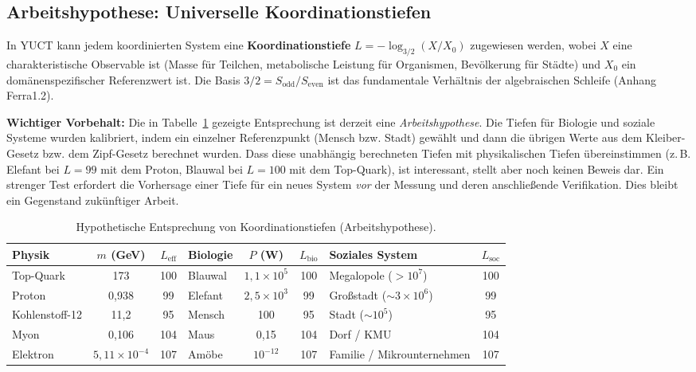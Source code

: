 \documentclass[11pt]{article}
\theoremstyle{remark}
\begin{document}
	\subsection{Arbeitshypothese: Universelle Koordinationstiefen}
	\label{sec:isomorphism}
	
	In YUCT kann jedem koordinierten System eine \textbf{Koordinationstiefe} \(L = -\log_{3/2}(X/X_0)\) zugewiesen werden, wobei \(X\) eine charakteristische Observable ist (Masse für Teilchen, metabolische Leistung für Organismen, Bevölkerung für Städte) und \(X_0\) ein domänenspezifischer Referenzwert ist. Die Basis \(3/2 = S_{\mathrm{odd}}/S_{\mathrm{even}}\) ist das fundamentale Verhältnis der algebraischen Schleife (Anhang Ferra1.2).
	
	\textbf{Wichtiger Vorbehalt:} Die in Tabelle~\ref{tab:universal_depths} gezeigte Entsprechung ist derzeit eine \emph{Arbeitshypothese}. Die Tiefen für Biologie und soziale Systeme wurden kalibriert, indem ein einzelner Referenzpunkt (Mensch bzw. Stadt) gewählt und dann die übrigen Werte aus dem Kleiber-Gesetz bzw. dem Zipf-Gesetz berechnet wurden. Dass diese unabhängig berechneten Tiefen mit physikalischen Tiefen übereinstimmen (z. B. Elefant bei \(L=99\) mit dem Proton, Blauwal bei \(L=100\) mit dem Top-Quark), ist interessant, stellt aber noch keinen Beweis dar. Ein strenger Test erfordert die Vorhersage einer Tiefe für ein neues System \emph{vor} der Messung und deren anschließende Verifikation. Dies bleibt ein Gegenstand zukünftiger Arbeit.
	
	\begin{table}[H]
		\centering
		\caption{Hypothetische Entsprechung von Koordinationstiefen (Arbeitshypothese).}
		\label{tab:universal_depths}
		\footnotesize
		\begin{tabular}{l c c l c c l c}
			\toprule
			\textbf{Physik} & \(m\) (GeV) & \(L_{\mathrm{eff}}\) & \textbf{Biologie} & \(P\) (W) & \(L_{\mathrm{bio}}\) & \textbf{Soziales System} & \(L_{\mathrm{soc}}\) \\
			\midrule
			Top-Quark & 173 & 100 & Blauwal & \(1,1\times10^5\) & 100 & Megalopole ($>10^7$) & 100 \\
			Proton & 0,938 & 99 & Elefant & \(2,5\times10^3\) & 99 & Großstadt ($\sim 3\times10^6$) & 99 \\
			Kohlenstoff-12 & 11,2 & 95 & Mensch & 100 & 95 & Stadt ($\sim 10^5$) & 95 \\
			Myon & 0,106 & 104 & Maus & 0,15 & 104 & Dorf / KMU & 104 \\
			Elektron & \(5,11\times10^{-4}\) & 107 & Amöbe & \(10^{-12}\) & 107 & Familie / Mikrounternehmen & 107 \\
			\bottomrule
		\end{tabular}
	\end{table}
	
\end{document}
